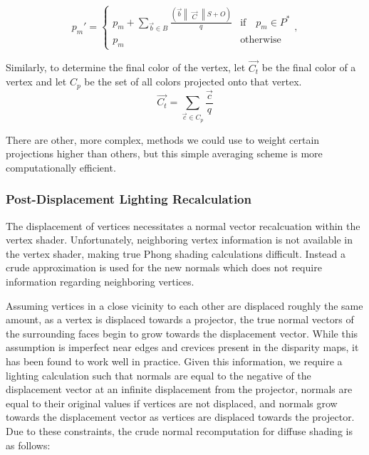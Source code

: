 \documentclass[a4paper,twoside]{article}
\begin{document}
\begin{equation}
p_{m}' = \left \{ 
\begin{array}{ll}
p_{m} + \sum\limits_{\vec{b} \in B} \frac{(\vec{b} \begin{Vmatrix}\vec{C}\end{Vmatrix} S + O)}{q} & \text{if} \quad p_{m} \in P^{*}\\
p_{m} & \text{otherwise}
\end{array},\right.
\label{eq:displaceBlend}
\end{equation}

Similarly, to determine the final color of the vertex, let $\vec{C_t}$ be the final color of a vertex and let $C_p$ be the set of all colors projected onto that vertex. 
\begin{equation}
\vec{C_t} = \sum\limits_{\vec{c} \in C_p} \frac{\vec{c}}{q} 
\label{eq:colorBlend}
\end{equation}

There are other, more complex, methods we could use to weight certain projections higher than others, but this simple averaging scheme is more computationally efficient. 
 
 \subsubsection{Post-Displacement Lighting Recalculation}
 
 The displacement of vertices necessitates a normal vector recalcuation within the vertex shader. Unfortunately, neighboring vertex information is not available in the vertex shader, making true Phong shading calculations difficult. Instead a crude approximation is used for the new normals which does not require information regarding neighboring vertices.

Assuming vertices in a close vicinity to each other are displaced roughly the same amount, as a vertex is displaced towards a projector, the true normal vectors of the surrounding faces begin to grow towards the displacement vector. While this assumption is imperfect near edges and crevices present in the disparity maps, it has been found to work well in practice. Given this information, we require a lighting calculation such that normals are equal to the negative of the displacement vector at an infinite displacement from the projector, normals are equal to their original values if vertices are not displaced, and normals grow towards the displacement vector as vertices are displaced towards the projector. Due to these constraints, the crude normal recomputation for diffuse shading is as follows:
\end{document}
